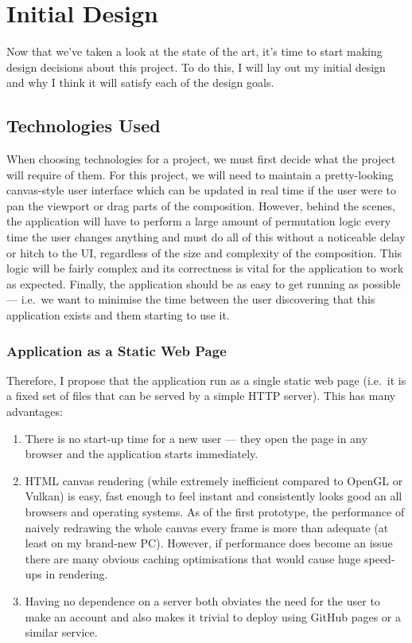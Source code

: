 \documentclass[12pt]{article}
\begin{document}
\section{Initial Design}

Now that we've taken a look at the state of the art, it's time to start making design decisions
about this project.  To do this, I will lay out my initial design and why I think it will satisfy
each of the design goals.

\subsection{Technologies Used}

When choosing technologies for a project, we must first decide what the project will require of
them.  For this project, we will need to maintain a pretty-looking canvas-style user interface which
can be updated in real time if the user were to pan the viewport or drag parts of the composition.
However, behind the scenes, the application will have to perform a large amount of permutation logic
every time the user changes anything and must do all of this without a noticeable delay or hitch to
the UI, regardless of the size and complexity of the composition.  This logic will be fairly complex
and its correctness is vital for the application to work as expected.  Finally, the application
should be as easy to get running as possible --- i.e.\ we want to minimise the time between the user
discovering that this application exists and them starting to use it.

\subsubsection{Application as a Static Web Page}

Therefore, I propose that the application run as a single static web page (i.e.\ it is a fixed set
of files that can be served by a simple HTTP server).  This has many advantages:
\begin{enumerate}
    \item There is no start-up time for a new user --- they open the page in any browser and the
        application starts immediately.
    \item HTML canvas rendering (while extremely inefficient compared to OpenGL or Vulkan) is easy,
        fast enough to feel instant and consistently looks good an all browsers and operating
        systems.  As of the first prototype, the performance of naively redrawing the whole canvas
        every frame is more than adequate (at least on my brand-new PC).  However, if performance
        does become an issue there are many obvious caching optimisations that would cause huge
        speed-ups in rendering.
    \item Having no dependence on a server both obviates the need for the user to make an account
        and also makes it trivial to deploy using GitHub pages or a similar service.
\end{enumerate}
\end{document}
